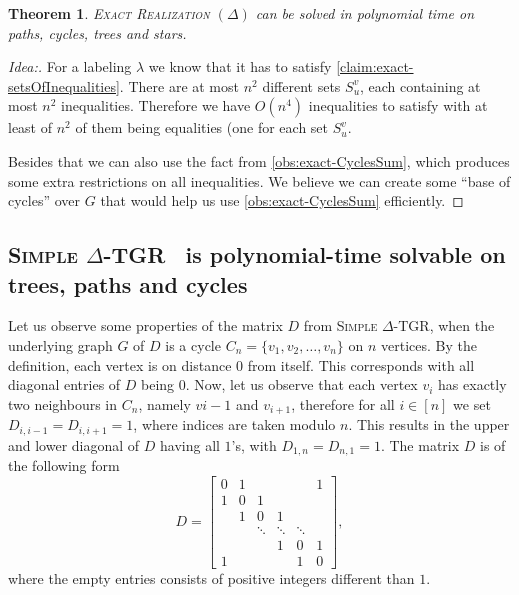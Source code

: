 \documentclass[11pt,a4paper]{article}
\newtheorem{theorem}{Theorem}
\theoremstyle{remark}
\theoremstyle{definition}
\newcommand{\deltaExact}{\textsc{Simple $\Delta$-TGR}}
\begin{document}
\begin{theorem}
	\textsc{Exact Realization $(\Delta)$} can be solved in polynomial time on paths, cycles, trees and stars.
\end{theorem}

\begin{proof}[Idea:]
    For a labeling $\lambda$ we know that it has to satisfy \cref{claim:exact-setsOfInequalities}.
    There are at most $n^2$ different sets $S_u^v$, each containing at most $n^2$ inequalities. 
    Therefore we have $O(n^4)$ inequalities to satisfy with at least of $n^2$ of them being equalities (one for each set $S_u^v$. 
    
    Besides that we can also use the fact from \cref{obs:exact-CyclesSum}, which produces some extra restrictions on all inequalities.
    We believe we can create some ``base of cycles'' over $G$ that would help us use \cref{obs:exact-CyclesSum} efficiently.
\end{proof}

\subsection{
\texorpdfstring{\deltaExact\ } {Simple Delta-TGR}
is polynomial-time solvable on trees, paths and cycles}

Let us observe some properties of the matrix $D$ from \deltaExact, when the underlying graph $G$ of $D$ is a cycle $C_n = \{v_1, v_2, \dots, v_n\}$  on $n$ vertices.
By the definition, each vertex is on distance $0$ from itself. This corresponds with all diagonal entries of $D$ being $0$.
Now, let us observe that each vertex $v_i$ has exactly two neighbours in $C_n$, namely $v{i-1}$ and $v_{i+1}$,
therefore for all $i\in [n]$ we set $D_{i,i-1} = D_{i, i+1} = 1$, where indices are taken modulo $n$.
This results in the upper and lower diagonal of $D$ having all $1$'s, with $D_{1,n} = D_{n,1} = 1$.
The matrix $D$ is of the following form
\begin{equation*}
  D = 
  \begin{bmatrix}
    0 & 1 &  &  &  & 1\\
    1 & 0 & 1 &  &  & \\
    & 1 & 0 & 1 & & \\
    & & \ddots & \ddots & \ddots &   \\
    &   & &1 &  0 & 1\\ 
    1 &  &  &  &1 &  0 
  \end{bmatrix},
\end{equation*}
where the empty entries consists of positive integers different than $1$.
\end{document}
